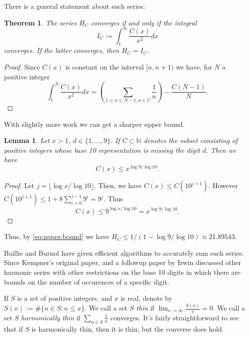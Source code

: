 \documentclass{article}
\newtheorem{lemma}[section]{Lemma}
\newtheorem{theorem}[section]{Theorem}
\begin{document}
There is a general statement about such series:
\begin{theorem}
\label{eq:upper:bound}
  The series $H_C$ converges if and only if the integral
  \begin{displaymath}
    I_C := \int_1^\infty \frac{C(x)}{x^2} dx
  \end{displaymath}
converges. If the latter converges, then $H_C = I_C$.
\end{theorem}
\begin{proof}
  Since $C(x)$ is constant on the interval $[n,n+1)$ we have, for $N$
  a positive integer
  \begin{displaymath}
    \int_1^N \frac{C(x)}{x^2} dx = \left(\sum_{1 \le n \le N-1, n \in C}
    \frac{1}{n}\right) - \frac{C(N-1)}{N}.
  \end{displaymath}
\end{proof}
With slightly more work we can get a sharper upper bound.

\begin{lemma}
  Let $x > 1$, $d \in \{1,\dots,9\}$.
  If $C \subset \mathbb{N}$ denotes the subset consisting of positive
  integers whose base 10 representation is missing the digit $d$.
  Then we have
  \begin{displaymath}
    C(x) \le x^{\log 9/\log 10}.
  \end{displaymath}
\end{lemma}
\begin{proof}
  Let $j = \lfloor \log x/\log 10 \rfloor$. Then, we have
  $C(x) \le C(10^{j+1})$. However
  $C(10^{j+1}) \le 1 + 8 \sum_{i=0}^{j-1} 9^i = 9^j$.
  Thus
  \begin{displaymath}
    C(x) \le 9^{\log x/\log 10} = x^{\log 9/\log 10}.
  \end{displaymath}
\end{proof}

Thus, by \eqref{eq:upper:bound} we have $H_C \le 1/(1-\log 9 /\log
{10}) \approx 21.89543$.

Baillie \cite{baillie1979sums} and Burnol \cite{burnol2024moments}
have given efficient algorithms to accurately sum such series.
Since Kempner's original paper, and a followup paper by Irwin 
\cite{irwin1916curious} discussed other harmonic series with other
restrictions on the base 10 digits in which there are bounds on the
number of occurences of a specific digit.

If $S$ is a set of positive integers, and $x$ is real, denote by $S(x)
:= \#\{n \in S: n \le x\}$. We call a set $S$ \emph{thin} if
$\lim_{x \rightarrow \infty} \frac{S(x)}{x} = 0$. We call a set $S$
\emph{harmonically thin} if $\sum_{n \in S} \frac{1}{n}$ converges.
It's fairly straightforward to see that if $S$ is harmonically thin,
then it is thin, but the converse does hold.
\end{document}
